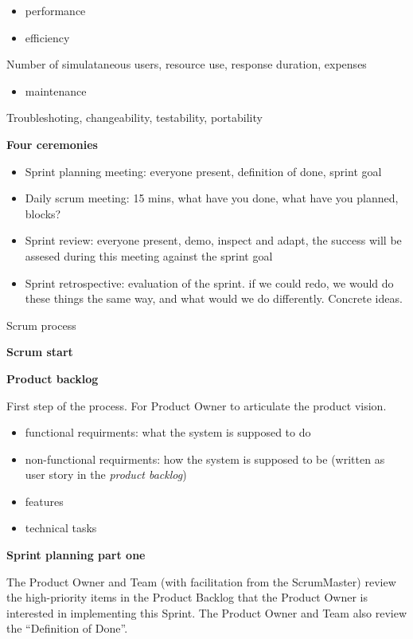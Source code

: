\documentclass{article}
\begin{document}
\begin{flushleft}
    \begin{itemize}
        \item performance
        \item efficiency
    \end{itemize}
    Number of simulataneous users, resource use, response duration, expenses

    \begin{itemize}
        \item maintenance
    \end{itemize}
    Troubleshoting, changeability, testability, portability
    
    \bigskip

    \textbf{Four ceremonies}\par
    \begin{itemize}
        \item Sprint planning meeting: everyone present, definition of done, sprint goal
        \item Daily scrum meeting: 15 mins, what have you done, what have you planned, blocks?
        \item Sprint review: everyone present, demo, inspect and adapt, the success will be assesed during this meeting against the sprint goal
        \item Sprint retrospective: evaluation of the sprint. if we could redo, we would do these things the same way, and what would we do differently. Concrete ideas. 
    \end{itemize}


    Scrum process
    \dotfill
    \bigskip

    \textbf{\large Scrum start}\par
    \textbf{Product backlog}\par
    First step of the process. For Product Owner to articulate the product vision. 
    \begin{itemize}
        \item functional requirments: what the system is supposed to do
        \item non-functional requirments: how the system is supposed to be (written as user story in the \emph{product backlog})
        \item features
        \item technical tasks
    \end{itemize}


    \textbf{Sprint planning part one}\par
    The Product Owner and Team (with facilitation from the ScrumMaster) review the high-priority items in the Product Backlog that the Product Owner is interested in implementing this Sprint. 
    The Product Owner and Team also review the “Definition of Done”.
    \bigskip


\end{flushleft}
\end{document}
